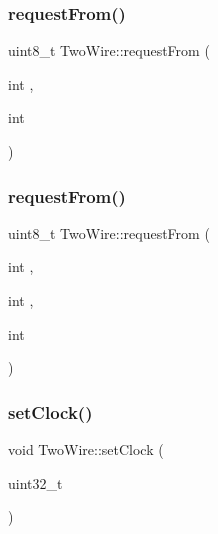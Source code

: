 \mbox{\label{class_two_wire_ad40a27213d0bb32f7b819aa8962fccd3}} 
\subsubsection{\texorpdfstring{request\+From()}{requestFrom()}\hspace{0.1cm}{\footnotesize\ttfamily [4/5]}}
{\footnotesize\ttfamily uint8\+\_\+t Two\+Wire\+::request\+From (\begin{DoxyParamCaption}\item[{int}]{,  }\item[{int}]{ }\end{DoxyParamCaption})}

\mbox{\label{class_two_wire_a3d76da36fb8571e0b5e8310e9f86f6fe}} 
\subsubsection{\texorpdfstring{request\+From()}{requestFrom()}\hspace{0.1cm}{\footnotesize\ttfamily [5/5]}}
{\footnotesize\ttfamily uint8\+\_\+t Two\+Wire\+::request\+From (\begin{DoxyParamCaption}\item[{int}]{,  }\item[{int}]{,  }\item[{int}]{ }\end{DoxyParamCaption})}

\mbox{\label{class_two_wire_a3c4aaae8779a8c34d8a1a90ff317d982}} 
\subsubsection{\texorpdfstring{set\+Clock()}{setClock()}}
{\footnotesize\ttfamily void Two\+Wire\+::set\+Clock (\begin{DoxyParamCaption}\item[{uint32\+\_\+t}]{ }\end{DoxyParamCaption})}

